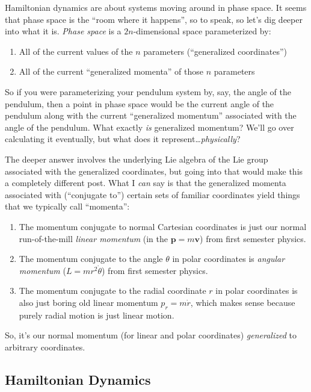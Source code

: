 \documentclass[]{article}
\begin{document}
Hamiltonian dynamics are about systems moving around in phase space. It seems
that phase space is the ``room where it happens'', so to speak, so let's dig
deeper into what it is. \emph{Phase space} is a \(2n\)-dimensional space
parameterized by:

\begin{enumerate}
\def\labelenumi{\arabic{enumi}.}
\tightlist
\item
  All of the current values of the \(n\) parameters (``generalized
  coordinates'')
\item
  All of the current ``generalized momenta'' of those \(n\) parameters
\end{enumerate}

So if you were parameterizing your pendulum system by, say, the angle of the
pendulum, then a point in phase space would be the current angle of the pendulum
along with the current ``generalized momentum'' associated with the angle of the
pendulum. What exactly \emph{is} generalized momentum? We'll go over calculating
it eventually, but what does it represent\ldots{}\emph{physically}?

The deeper answer involves the underlying Lie algebra of the Lie group
associated with the generalized coordinates, but going into that would make this
a completely different post. What I \emph{can} say is that the generalized
momenta associated with (``conjugate to'') certain sets of familiar coordinates
yield things that we typically call ``momenta'':

\begin{enumerate}
\def\labelenumi{\arabic{enumi}.}
\item
  The momentum conjugate to normal Cartesian coordinates is just our normal
  run-of-the-mill \emph{linear momentum} (in the \(\mathbf{p} = m \mathbf{v}\))
  from first semester physics.
\item
  The momentum conjugate to the angle \(\theta\) in polar coordinates is
  \emph{angular momentum} (\(L = m r^2 \dot{\theta}\)) from first semester
  physics.
\item
  The momentum conjugate to the radial coordinate \(r\) in polar coordinates is
  also just boring old linear momentum \(p_r = m \dot{r}\), which makes sense
  because purely radial motion is just linear motion.
\end{enumerate}

So, it's our normal momentum (for linear and polar coordinates)
\emph{generalized} to arbitrary coordinates.

\hypertarget{hamiltonian-dynamics}{%
\subsection{Hamiltonian Dynamics}\label{hamiltonian-dynamics}}
\end{document}
